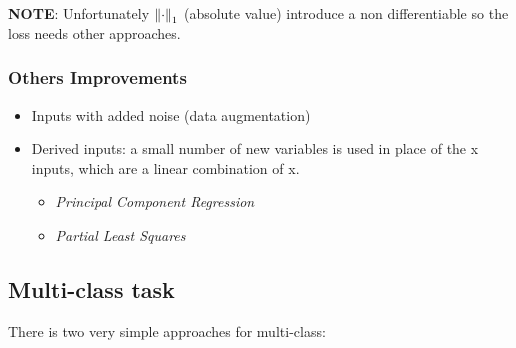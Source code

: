 \documentclass[../main.tex]{subfiles}
\begin{document}
\textbf{NOTE}: Unfortunately $\left\lVert\cdot\right\rVert_1$ (absolute value) introduce a non differentiable so the loss needs other approaches.

\subsubsection{Others Improvements}
\begin{itemize}
    \item Inputs with added noise (data augmentation)
    \item Derived inputs: a small number of new variables is used in place of the x inputs, which are a linear combination of x.
    \begin{itemize}
        \item \textit{Principal Component Regression}
        \item \textit{Partial Least Squares}
    \end{itemize}
\end{itemize}

\subsection{Multi-class task}
There is two very simple approaches for multi-class:
\end{document}
